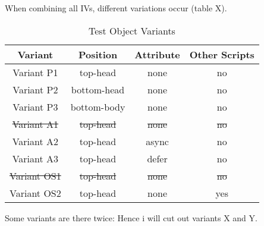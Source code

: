 When combining all IVs, different variations occur (table X).



\begin{table}[h]
	\small
	\centering
	\begin{tabular}{  | c || c | c | c | } 
	\hline
	Variant & Position & Attribute & Other Scripts \\
	\hline \hline
	Variant P1 & top-head & \cellcolor{lightgrey} none & \cellcolor{lightgrey} no \\
	   Variant P2 & bottom-head & \cellcolor{lightgrey} none & \cellcolor{lightgrey} no \\
	   Variant P3 & bottom-body & \cellcolor{lightgrey} none & \cellcolor{lightgrey} no \\
	  \hline
	   \sout{Variant A1} & \cellcolor{lightgrey} \sout{top-head} & \sout{none} & \cellcolor{lightgrey} \sout{no} \\
	   Variant A2 & \cellcolor{lightgrey} top-head & async & \cellcolor{lightgrey} no \\
	   Variant A3 & \cellcolor{lightgrey} top-head & defer & \cellcolor{lightgrey} no \\
	  \hline
	  \sout{Variant OS1} & \cellcolor{lightgrey} \sout{top-head} & \cellcolor{lightgrey} \sout{none} & \sout{no} \\
	  Variant OS2 & \cellcolor{lightgrey} top-head & \cellcolor{lightgrey} none & yes \\
	  \hline
	\end{tabular}
	\medskip
	\caption{Test Object Variants}
	\label{table:test_object_variants}
\end{table}


Some variants are there twice:
Hence i will cut out variants X and Y.




